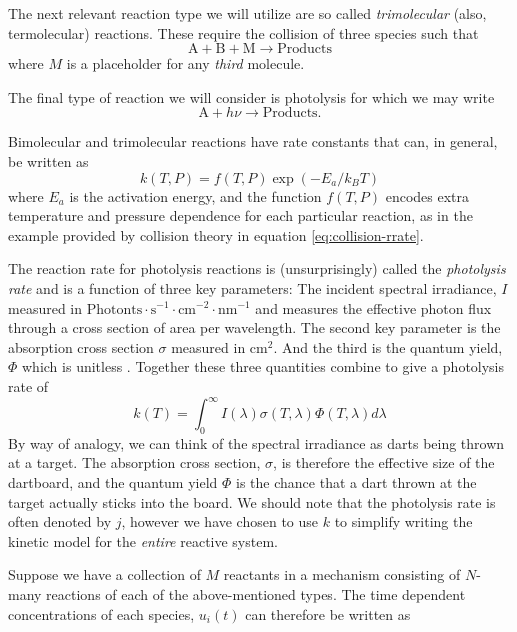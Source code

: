 The next relevant reaction type we will utilize are so called \textit{trimolecular} (also, termolecular) reactions. These require the collision of three species such that
\begin{equation}
  \mathrm{A} + \mathrm{B} + \mathrm{M} \longrightarrow \text{Products}
\end{equation}
where $M$ is a placeholder for any \textit{third} molecule.

The final type of reaction we will consider is photolysis for which we may write
\begin{equation}
  \mathrm{A} + h\nu \longrightarrow \text{Products}.
\end{equation}

Bimolecular and trimolecular reactions have rate constants that can, in general, be written as
\begin{equation}
  k(T,P) = f(T,P)\exp(-E_a/k_BT)
\end{equation}
where $E_a$ is the activation energy, and the function $f(T,P)$ encodes extra temperature and pressure dependence for each particular reaction, as in the example provided by collision theory in equation \ref{eq:collision-rrate}.

The reaction rate for photolysis reactions is (unsurprisingly) called the \textit{photolysis rate} and is a function of three key parameters: The incident spectral irradiance, $I$ measured in $\text{Photonts}\cdot \text{s}^{-1}\cdot \text{cm}^{-2}\cdot \text{nm}^{-1}$ and measures the effective photon flux through a cross section of area per wavelength. The second key parameter is the absorption cross section $\sigma$ measured in $\text{cm}^2$. And the third is the quantum yield, $\Phi$ which is unitless \cite{photolysis-rate-determination}. Together these three quantities combine to give a photolysis rate of
\begin{equation}
  k(T) = \int_0^\infty I(\lambda)\sigma(T,\lambda)\Phi(T,\lambda) d \lambda
\end{equation}
By way of analogy, we can think of the spectral irradiance as darts being thrown at a target. The absorption cross section, $\sigma$, is therefore the effective size of the dartboard, and the quantum yield $\Phi$ is the chance that a dart thrown at the target actually sticks into the board. We should note that the photolysis rate is often denoted by $j$, however we have chosen to use $k$ to simplify writing the kinetic model for the \textit{entire} reactive system.

Suppose we have a collection of $M$ reactants in a mechanism consisting of $N$-many reactions of each of the above-mentioned types. The time dependent concentrations of each species, $u_i(t)$ can therefore be written as

